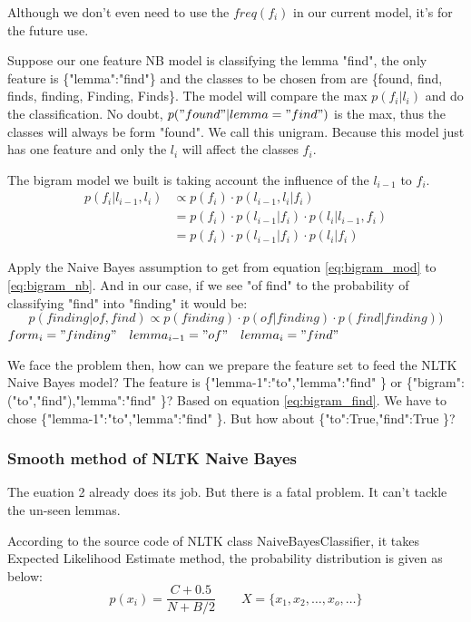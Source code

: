 \documentclass[a4paper]{article}
\begin{document}
Although we don't even need to use the $freq(f_i)$ in our current model, it's for the future use.

Suppose our one feature NB model is classifying the lemma "find", the only feature is \{"lemma":"find"\} and the classes to be chosen from are \{found, find, finds, finding, Finding, Finds\}. The model will compare the max $p(f_i|l_i)$ and do the classification. No doubt, $p("found" | lemma="find")$ is the max, thus the classes will always be form "found". We call this unigram. Because this model just has one feature and only the $l_i$ will affect the classes $f_i$. 

The bigram model we built is taking account the influence of the $l_{i-1}$ to $f_i$.
\begin{align}
p(f_i|l_{i-1},l_i) &\propto p(f_i) \cdot  p(l_{i-1},l_i|f_i)  \\
&= p(f_i) \cdot  p(l_{i-1}|f_i) \cdot p( l_i | l_{i-1},f_i) \label{eq:bigram_mod} \\
&= p(f_i) \cdot  p(l_{i-1}|f_i) \cdot p( l_i | f_i) \label{eq:bigram_nb}
\end{align}

Apply the Naive Bayes assumption to get from equation \ref{eq:bigram_mod} to \ref{eq:bigram_nb}. And in our case, if we see "of find" to the probability of classifying "find" into "finding"   it would be:
\begin{equation} \label{eq:bigram_find}
p(finding | of,find) \propto p(finding)\cdot p(of | finding) \cdot  p(find | finding))
\end{equation}
$form_i="finding" \quad lemma_{i-1}="of" \quad lemma_i="find"$


We face the problem then, how can we prepare the feature set to feed the NLTK Naive Bayes model? The feature is \{"lemma-1":"to","lemma":"find" \} or 
 \{"bigram":("to","find"),"lemma":"find" \}? Based on equation \ref{eq:bigram_find}. We have to chose \{"lemma-1":"to","lemma":"find" \}. But how about \{"to":True,"find":True \}?

\subsubsection{Smooth method of NLTK Naive Bayes}

The euation 2 already does its job. But there is a fatal problem. It can't tackle the un-seen lemmas. 

According to the source code of NLTK class NaiveBayesClassifier, it takes Expected Likelihood Estimate method, the probability distribution is given as below:
\begin{equation}
p(x_i)=\frac{C+0.5}{N+B/2} \qquad X = \{x_1,x_2,\dots,x_o,\dots\}
\end{equation}
\end{document}
